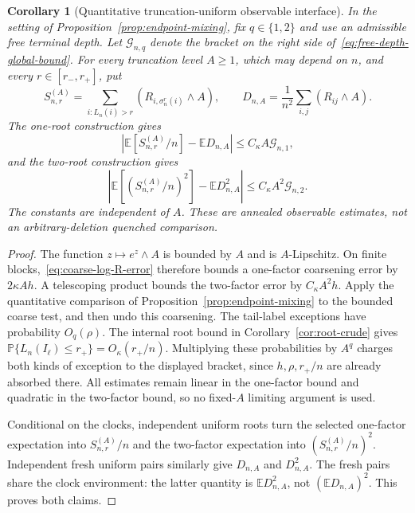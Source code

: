 \documentclass[11pt]{article}
\newcommand{\E}{\mathbb E}
\newcommand{\Pp}{\mathbb P}
\newcommand{\1}{\mathbf 1}
\newtheorem{corollary}[theorem]{Corollary}
\theoremstyle{definition}
\theoremstyle{remark}
\begin{document}
\begin{corollary}[Quantitative truncation-uniform observable interface]
\label{cor:quantitative-truncation-interface}
In the setting of Proposition~\ref{prop:endpoint-mixing}, fix $q\in\{1,2\}$
and use an admissible free terminal depth. Let $\mathcal G_{n,q}$ denote
the bracket on the right side of~\eqref{eq:free-depth-global-bound}.
For every truncation level $A\ge1$, which may depend on $n$, and every
$r\in[r_-,r_+]$, put
\[
 S_{n,r}^{(A)}=\sum_{i:L_n(i)>r}(R_{i,\sigma_n^r(i)}\wedge A),
 \qquad D_{n,A}=\frac1{n^2}\sum_{i,j}(R_{ij}\wedge A).
\]
The one-root construction gives
\begin{equation}\label{eq:truncation-uniform-first}
 \left|\E[S_{n,r}^{(A)}/n]-\E D_{n,A}\right|
 \le C_\kappa A\mathcal G_{n,1},
\end{equation}
and the two-root construction gives
\begin{equation}\label{eq:truncation-uniform-second}
 \left|\E[(S_{n,r}^{(A)}/n)^2]-\E D_{n,A}^2\right|
 \le C_\kappa A^2\mathcal G_{n,2}.
\end{equation}
The constants are independent of $A$. These are annealed observable
estimates, not an arbitrary-deletion quenched comparison.
\end{corollary}
\begin{proof}
The function $z\mapsto e^z\wedge A$ is bounded by $A$ and is
$A$-Lipschitz. On finite blocks,~\eqref{eq:coarse-log-R-error}
therefore bounds a one-factor coarsening error by $2\kappa Ah$.
A telescoping product bounds the two-factor error by $C_\kappa A^2h$.
Apply the quantitative comparison of
Proposition~\ref{prop:endpoint-mixing} to the bounded coarse test,
and then undo this coarsening. The tail-label exceptions have probability
$O_q(\rho)$. The internal root bound
in Corollary~\ref{cor:root-crude} gives
$\Pp\{L_n(I_\ell)\le r_+\}=O_\kappa(r_+/n)$.
Multiplying these probabilities by $A^q$ charges both kinds of exception
to the displayed bracket, since $h,\rho,r_+/n$ are already absorbed there.
All estimates remain linear in the one-factor bound and quadratic in the
two-factor bound, so no fixed-$A$ limiting argument is used.

Conditional on the clocks, independent uniform roots turn the selected
one-factor expectation into $S_{n,r}^{(A)}/n$ and the two-factor
expectation into $(S_{n,r}^{(A)}/n)^2$. Independent fresh uniform pairs
similarly give $D_{n,A}$ and $D_{n,A}^2$.
The fresh pairs share the clock environment: the latter quantity is
$\E D_{n,A}^2$, not $(\E D_{n,A})^2$. This proves both claims.
\end{proof}
\end{document}
